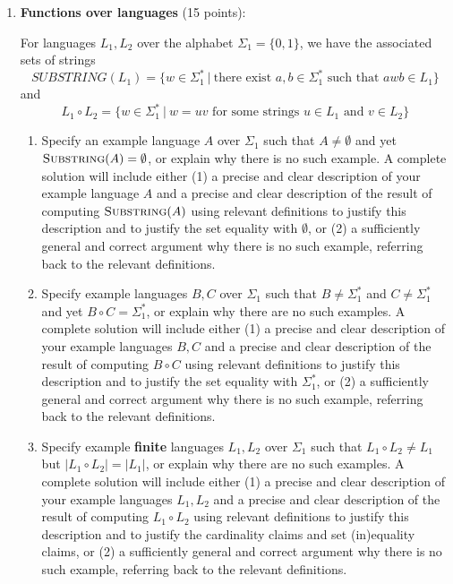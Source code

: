 \begin{enumerate}[wide, labelwidth=!, labelindent=0pt]
\begin{enumerate}
    \end{enumerate}

\item\gradeCorrectFirst \textbf{Functions over languages} (15 points):

For languages $L_1, L_2$ over the alphabet $\Sigma_1 = \{0,1\}$, we have the 
associated sets of strings
\[
    SUBSTRING(L_1) = \{ w \in \Sigma_1^* ~|~ \text{there exist } a,b \in \Sigma_1^* \text{ such that } awb \in L_1\}
\]
and 
\[
    L_1 \circ L_2 = \{ w \in \Sigma_1^* ~|~ w = uv \text{ for some strings } u \in L_1 \text{ and } v \in L_2 \}
\]
    \begin{enumerate}
    \item Specify an example language $A$ over $\Sigma_1$ such that 
    $A \neq \emptyset$ and yet $\textsc{Substring}(A) = \emptyset$, 
    or explain why there is no such example. 
    A complete solution will include either (1) a precise and
    clear description of your example language $A$ 
    and a precise and clear description of
    the result of computing $\textsc{Substring}(A)$ using relevant definitions 
    to justify this description and to justify the set equality with 
    $\emptyset$, or (2) a sufficiently general and correct argument
    why there is no such example, referring back to the relevant definitions.

    \item Specify example languages $B, C$ over $\Sigma_1$ such that 
    $B \neq \Sigma_1^*$ and $C \neq \Sigma_1^*$ and yet $B \circ C = \Sigma_1^*$, 
    or explain why there are no such examples. 
    A complete solution will include either (1) a precise and
    clear description of your example languages $B,C$ 
    and a precise and clear description of
    the result of computing $B \circ C$ using relevant definitions 
    to justify this description and to justify the set equality with 
    $\Sigma_1^*$, or (2) a sufficiently general and correct argument
    why there is no such example, referring back to the relevant definitions.

    \item Specify example {\bf finite} languages $L_1, L_2$ over $\Sigma_1$ such that 
    $L_1 \circ L_2 \neq L_1$ but $|L_1 \circ L_2| = |L_1|$, or 
    explain why there are no such examples.
    A complete solution will include either (1) a precise and
    clear description of your example languages $L_1, L_2$ 
    and a precise and clear description of
    the result of computing $L_1 \circ L_2$ using relevant definitions 
    to justify this description and to justify the cardinality claims and set (in)equality claims, 
    or (2) a sufficiently general and correct argument
    why there is no such example, referring back to the relevant definitions.
    \end{enumerate}



\end{enumerate}
